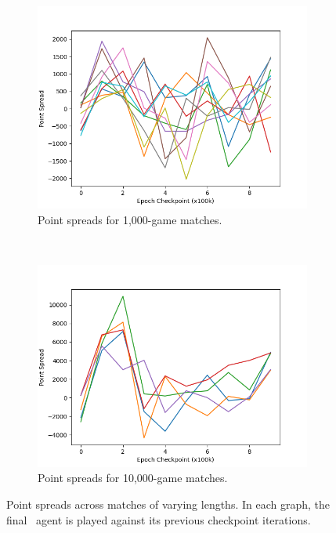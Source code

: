 \begin{figure}
\begin{subfigure}[b]{0.66\textwidth}
	\center
	\includegraphics[height=0.22\textheight]{images/discussion/usefulness/r2-time-series-1000.png}
	\caption{Point spreads for 1,000-game matches.}
	\label{r2-time-series-1000}
\end{subfigure}
~
\begin{subfigure}[b]{0.66\textwidth}
	\center
	\includegraphics[height=0.22\textheight]{images/discussion/usefulness/r2-time-series-10000.png}
	\caption{Point spreads for 10,000-game matches.}
	\label{r2-time-series-10000}
\end{subfigure}

\caption{
	Point spreads across matches of varying lengths.
	In each graph,
	the final \learned\ agent is played against its previous checkpoint
	iterations.
}
\label{fig:r2-time-series}
\end{figure}

